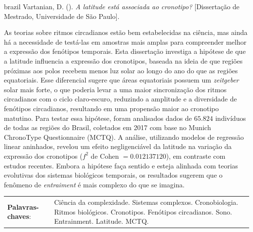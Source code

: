 \documentclass[
12pt,
openright,
oneside,
a4paper,
chapter=TITLE,
section=TITLE,
french,
spanish,
brazil,
english
]{abntex2}
\newcommand{\resumoestrangeironame}{Resumo}
\renewcommand{\resumoname}{Abstract}
\renewcommand{\resumoestrangeironame}{Resumo}
\renewcommand{\resumoname}{Resumo}
\renewcommand{\resumoestrangeironame}{Abstract}
\renewcommand{\resumoname}{Resumen}
\renewcommand{\resumoestrangeironame}{Resumo}
\renewcommand{\resumoname}{Résumé}
\renewcommand{\resumoestrangeironame}{Resumo}
\newenvironment{resumoenv}[1][\resumoname]{
  \pretextualchapter{#1}
  \begingroup
  \setlength{\parindent}{0cm}
  \setlength{\parskip}{\smallskipamount} %
  \AtBeginEnvironment{tabular}{\normalsize}
  \renewcommand{\arraystretch}{1}
  \setlength{\aboverulesep}{0ex}
  \setlength{\belowrulesep}{0ex}
  \setlength{\arrayrulewidth}{0pt}
  \setlength{\tabcolsep}{0cm}
  \vspace{-\smallskipamount} %
  \begin{SingleSpace}
}{
  \end{SingleSpace}
  \cleardoublepage
  \endgroup
}
\renewcommand{\arraystretch}{1.5}
\begin{document}

\begin{resumoenv}[\resumoestrangeironame]
\begin{otherlanguage*}{brazil}
Vartanian, D. ({\imprimirdata}). \textit{A latitude está associada ao cronotipo?} [Dissertação de Mestrado, Universidade de São Paulo].


As teorias sobre ritmos circadianos estão bem estabelecidas na ciência,
mas ainda há a necessidade de testá-las em amostras mais amplas para
compreender melhor a expressão dos fenótipos temporais. Esta dissertação
investiga a hipótese de que a latitude influencia a expressão dos
cronotipos, baseada na ideia de que regiões próximas aos polos recebem
menos luz solar ao longo do ano do que as regiões equatoriais. Esse
diferencial sugere que áreas equatoriais possuem um \emph{zeitgeber}
solar mais forte, o que poderia levar a uma maior sincronização dos
ritmos circadianos com o ciclo claro-escuro, reduzindo a amplitude e a
diversidade de fenótipos circadianos, resultando em uma propensão maior
ao cronotipo matutino. Para testar essa hipótese, foram analisados dados
de \(65.824\) indivíduos de todas as regiões do Brasil, coletados em
2017 com base no Munich ChronoType Questionnaire (MCTQ). A análise,
utilizando modelos de regressão linear aninhados, revelou um efeito
negligenciável da latitude na variação da expressão dos cronotipos
(\(f^2\) de Cohen \(= 0.012137120\)), em contraste com estudos recentes.
Embora a hipótese faça sentido e esteja alinhada com teorias evolutivas
dos sistemas biológicos temporais, os resultados sugerem que o fenômeno
de \emph{entraiment} é mais complexo do que se imagina.


\begin{tabular}{p{3.6cm} p{12.3cm}}
  \textbf{Palavras-chaves}: &  Ciência da complexidade. Sistemas complexos. Cronobiologia. Ritmos biológicos. Cronotipos. Fenótipos circadianos. Sono. Entrainment. Latitude. MCTQ.
\end{tabular}
\end{otherlanguage*}
\end{resumoenv}
\end{document}
